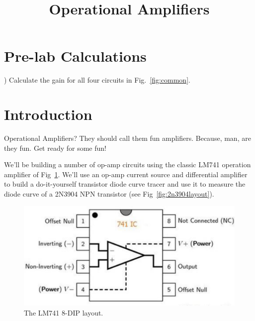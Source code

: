 \documentclass[12pt]{article}
\begin{document}

\title{Operational Amplifiers}

\maketitle

\section{Pre-lab Calculations}
) Calculate the gain for all four circuits in Fig.~\ref{fig:common}. \\

\section{Introduction}

Operational Amplifiers?  They should call them fun amplifiers.  Because, man, are they fun.  Get ready for some fun!

We'll be building a number of op-amp circuits using the classic LM741 operation amplifier of Fig~\ref{fig:lm741layout}.  We'll use an op-amp current source and differential amplifier to build a do-it-yourself transistor diode curve tracer and use it to measure the diode curve of a 2N3904 NPN transistor (see Fig~\ref{fig:2n3904layout}).

\begin{figure}[htbp]
\begin{center}
\includegraphics[height=0.15\textheight]{figs/lm741.pdf} 
\end{center}
\caption{The LM741 8-DIP layout.}
\label{fig:lm741layout}
\end{figure}
\end{document}
